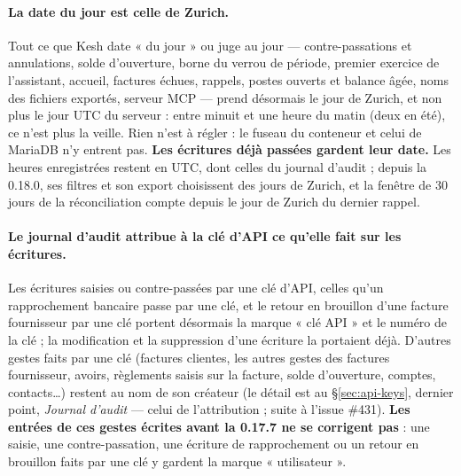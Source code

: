 \documentclass[a4paper,11pt,oneside]{article}
\begin{document}
\paragraph{La date du jour est celle de Zurich.} Tout ce que Kesh date « du jour » ou juge au jour --- contre-passations et annulations, solde d'ouverture, borne du verrou de période, premier exercice de l'assistant, accueil, factures échues, rappels, postes ouverts et balance âgée, noms des fichiers exportés, serveur MCP --- prend désormais le jour de Zurich, et non plus le jour UTC du serveur : entre minuit et une heure du matin (deux en été), ce n'est plus la veille. Rien n'est à régler : le fuseau du conteneur et celui de MariaDB n'y entrent pas. \textbf{Les écritures déjà passées gardent leur date.} Les heures enregistrées restent en UTC, dont celles du journal d'audit ; depuis la 0.18.0, ses filtres et son export choisissent des jours de Zurich, et la fenêtre de 30 jours de la réconciliation compte depuis le jour de Zurich du dernier rappel.

\paragraph{Le journal d'audit attribue à la clé d'API ce qu'elle fait sur les écritures.} Les écritures saisies ou contre-passées par une clé d'API, celles qu'un rapprochement bancaire passe par une clé, et le retour en brouillon d'une facture fournisseur par une clé portent désormais la marque « clé API » et le numéro de la clé ; la modification et la suppression d'une écriture la portaient déjà. D'autres gestes faits par une clé (factures clientes, les autres gestes des factures fournisseur, avoirs, règlements saisis sur la facture, solde d'ouverture, comptes, contacts\ldots) restent au nom de son créateur (le détail est au \S\ref{sec:api-keys}, dernier point, \emph{Journal d'audit} --- celui de l'attribution ; suite à l'issue \#431). \textbf{Les entrées de ces gestes écrites avant la 0.17.7 ne se corrigent pas} : une saisie, une contre-passation, une écriture de rapprochement ou un retour en brouillon faits par une clé y gardent la marque « utilisateur ».
\end{document}
